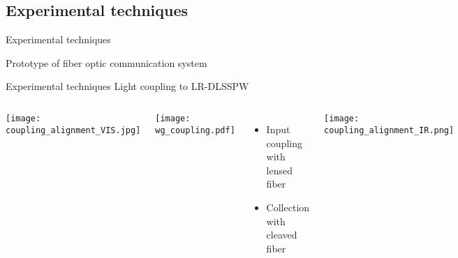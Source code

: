   \subsection{Experimental techniques} %
  \label{sub:experimental_techniques}
  
  \begin{frame}{Experimental techniques}
    \begin{block}{Prototype of fiber optic communication system}
      \begin{center}
      \end{center}
    \end{block}
  \end{frame}


  \begin{frame}{Experimental techniques}
               {Light coupling to LR-DLSSPW}
    \begin{columns}
        \texttt{[image: coupling\_alignment\_VIS.jpg]}
        \begin{center}
          \texttt{[image: wg\_coupling.pdf]}          
        \end{center}
        \vspace{-2mm}
        \begin{itemize}
          \item Input coupling with lensed fiber
          \item Collection with cleaved fiber
        \end{itemize}
        \vspace{4mm}
        \texttt{[image: coupling\_alignment\_IR.png]}
    \end{columns}
  \end{frame}

